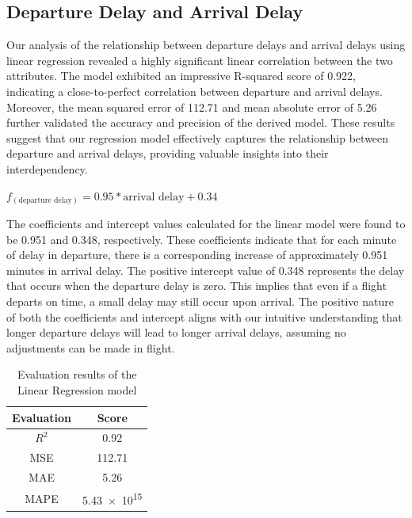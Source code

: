 \documentclass[11pt]{article}
\begin{document}
\subsection{Departure Delay and Arrival Delay}
Our analysis of the relationship between departure delays and arrival delays using linear regression revealed a highly significant linear correlation between the two attributes. The model exhibited an impressive R-squared score of 0.922, indicating a close-to-perfect correlation between departure and arrival delays. Moreover, the mean squared error of 112.71 and mean absolute error of 5.26 further validated the accuracy and precision of the derived model. These results suggest that our regression model effectively captures the relationship between departure and arrival delays, providing valuable insights into their interdependency.

\begin{center}
        $f_{(\text{departure delay})} = 0.95 * \text{arrival delay} + 0.34$
\end{center}

The coefficients and intercept values calculated for the linear model were found to be 0.951 and 0.348, respectively. These coefficients indicate that for each minute of delay in departure, there is a corresponding increase of approximately 0.951 minutes in arrival delay. The positive intercept value of 0.348 represents the delay that occurs when the departure delay is zero. This implies that even if a flight departs on time, a small delay may still occur upon arrival. The positive nature of both the coefficients and intercept aligns with our intuitive understanding that longer departure delays will lead to longer arrival delays, assuming no adjustments can be made in flight.

\begin{table}[!h]
    \centering
    \begin{tabular}{|c|c|}
        \hline
        Evaluation &  Score \\
        \hline
        $R^2$   &    0.92 \\
        \hline
        MSE     &   112.71  \\
        \hline
        MAE     &   5.26  \\
        \hline
        MAPE     &    \num{5.43e15}  \\
        \hline
    \end{tabular}
    \caption{\centering Evaluation results of the Linear Regression model}
    \label{tab:lr-3-eval}
\end{table}
\end{document}
